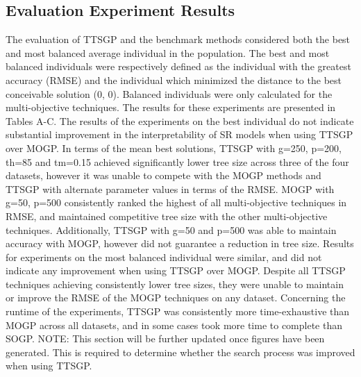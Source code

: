 \documentclass[a4paper, twocolumn]{article}
\begin{document}
\subsection{Evaluation Experiment Results}
The evaluation of TTSGP and the benchmark methods considered both the best and most balanced average individual in the population. The best and most balanced individuals were respectively defined as the individual with the greatest accuracy (RMSE) and the individual which minimized the distance to the best conceivable solution (0, 0). Balanced individuals were only calculated for the multi-objective techniques. The results for these experiments are presented in Tables A-C.
\newline
The results of the experiments on the best individual do not indicate substantial improvement in the interpretability of SR models when using TTSGP over MOGP. In terms of the mean best solutions, TTSGP with g=250, p=200, th=85 and tm=0.15 achieved significantly lower tree size across three of the four datasets, however it was unable to compete with the MOGP methods and TTSGP with alternate parameter values in terms of the RMSE. MOGP with g=50, p=500 consistently ranked the highest of all multi-objective techniques in RMSE, and maintained competitive tree size with the other multi-objective techniques. Additionally, TTSGP with g=50 and p=500 was able to maintain accuracy with MOGP, however did not guarantee a reduction in tree size.
\newline
Results for experiments on the most balanced individual were similar, and did not indicate any improvement when using TTSGP over MOGP. Despite all TTSGP techniques achieving consistently lower tree sizes, they were unable to maintain or improve the RMSE of the MOGP techniques on any dataset. Concerning the runtime of the experiments, TTSGP was consistently more time-exhaustive than MOGP across all datasets, and in some cases took more time to complete than SOGP.
\newline
NOTE: This section will be further updated once figures have been generated. This is required to determine whether the search process was improved when using TTSGP.
\end{document}
